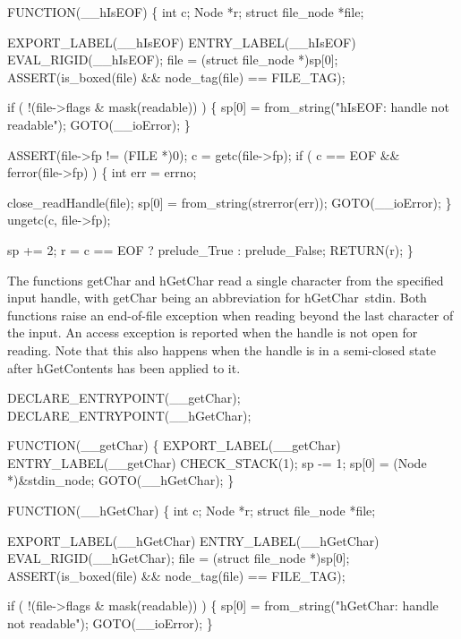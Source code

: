FUNCTION(__hIsEOF)
\{
    int              c;
    Node             *r;
    struct file_node *file;

    EXPORT_LABEL(__hIsEOF)
 ENTRY_LABEL(__hIsEOF)
    EVAL_RIGID(__hIsEOF);
    file = (struct file_node *)sp[0];
    ASSERT(is_boxed(file) && node_tag(file) == FILE_TAG);

    if ( !(file->flags & mask(readable)) )
    \{
        sp[0] = from_string("hIsEOF: handle not readable");
        GOTO(__ioError);
    \}

    ASSERT(file->fp != (FILE *)0);
    c = getc(file->fp);
    if ( c == EOF && ferror(file->fp) )
    \{
        int err = errno;

        close_readHandle(file);
        sp[0] = from_string(strerror(err));
        GOTO(__ioError);
    \}
    ungetc(c, file->fp);

    sp += 2;
    r   = c == EOF ? prelude_True : prelude_False;
    RETURN(r);
\}

\nwendcode{}\nwdocspar
The functions {\Tt{}getChar\nwendquote} and {\Tt{}hGetChar\nwendquote} read a single character
from the specified input handle, with {\Tt{}getChar\nwendquote} being an
abbreviation for {\Tt{}hGetChar\ stdin\nwendquote}. Both functions raise an
end-of-file exception when reading beyond the last character of the
input. An access exception is reported when the handle is not open for
reading. Note that this also happens when the handle is in a
semi-closed state after {\Tt{}hGetContents\nwendquote} has been applied to it.

\nwenddocs{}\plusendmoddef\nwstartdeflinemarkup{}\nwenddeflinemarkup
DECLARE_ENTRYPOINT(__getChar);
DECLARE_ENTRYPOINT(__hGetChar);

FUNCTION(__getChar)
\{
    EXPORT_LABEL(__getChar)
 ENTRY_LABEL(__getChar)
    CHECK_STACK(1);
    sp   -= 1;
    sp[0] = (Node *)&stdin_node;
    GOTO(__hGetChar);
\}

FUNCTION(__hGetChar)
\{
    int              c;
    Node             *r;
    struct file_node *file;

    EXPORT_LABEL(__hGetChar)
 ENTRY_LABEL(__hGetChar)
    EVAL_RIGID(__hGetChar);
    file = (struct file_node *)sp[0];
    ASSERT(is_boxed(file) && node_tag(file) == FILE_TAG);

    if ( !(file->flags & mask(readable)) )
    \{
        sp[0] = from_string("hGetChar: handle not readable");
        GOTO(__ioError);
    \}

